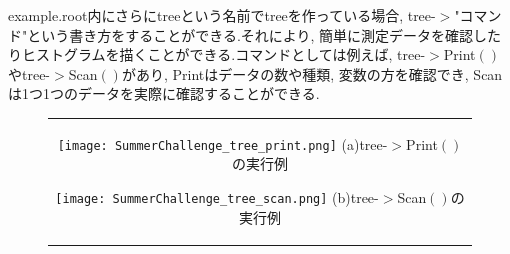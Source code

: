 example.root内にさらにtreeという名前でtreeを作っている場合, tree-$>$"コマンド"という書き方をすることができる.それにより, 簡単に測定データを確認したりヒストグラムを描くことができる.コマンドとしては例えば, tree-$>$Print$\left(\right)$やtree-$>$Scan$\left(\right)$があり, Printはデータの数や種類, 変数の方を確認でき, Scanは1つ1つのデータを実際に確認することができる.
\begin{figure}[htbp]
  \begin{center}
    \begin{tabular}{c}

      \begin{minipage}{0.5\hsize}
        \begin{center}
          \texttt{[image: SummerChallenge\_tree\_print.png]}
          \hspace{1.6cm} (a)tree-$>$Print$\left(\right)$の実行例
        \end{center}
      \end{minipage}

      \begin{minipage}{0.5\hsize}
        \begin{center}
          \texttt{[image: SummerChallenge\_tree\_scan.png]}
          \hspace{1.6cm} (b)tree-$>$Scan$\left(\right)$の実行例
        \end{center}
      \end{minipage}
    \end{tabular}
  \end{center}
\end{figure}

